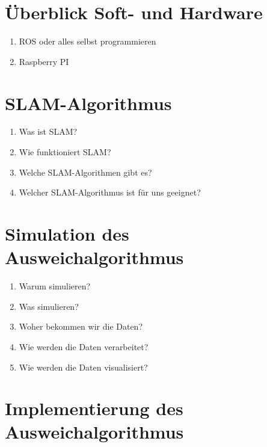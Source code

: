 \documentclass[12pt]{article}
\begin{document}
\section{Überblick Soft- und Hardware}


\begin{enumerate}
    \item ROS oder alles selbst programmieren
    \item Raspberry PI\\
\end{enumerate}

\section{SLAM-Algorithmus}

\begin{enumerate}
    \item Was ist SLAM?\\
    \item Wie funktioniert SLAM?\\
    \item Welche SLAM-Algorithmen gibt es?\\
    \item Welcher SLAM-Algorithmus ist für uns geeignet?\\

\end{enumerate}
\section{Simulation des Ausweichalgorithmus}

\begin{enumerate}
    \item Warum simulieren?\\
    \item Was simulieren?\\
    \item Woher bekommen wir die Daten?\\
    \item Wie werden die Daten verarbeitet?\\
    \item Wie werden die Daten visualisiert?\\
\end{enumerate}

\section{Implementierung des Ausweichalgorithmus}
\end{document}
